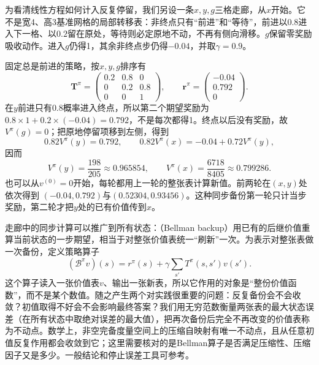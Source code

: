 \begin{example}[三个格子的独立手算模型]
 \label{ex:rl-planning-corridor}
 为看清线性方程如何计入反复停留，我们另设一条$x,y,g$三格走廊，从$x$开始。它不是宽4、高3基准网格的局部转移表：非终点只有“前进”和“等待”，前进以$0.8$进入下一格、以$0.2$留在原处，等待则必定原地不动，不再有侧向滑移。$g$保留零奖励吸收动作。进入$g$仍得1，其余非终点步仍得$-0.04$，并取$\gamma=0.9$。

 固定总是前进的策略，按$x,y,g$排序有
 \[
 \bm T^\pi=
 \begin{pmatrix}0.2&0.8&0\\0&0.2&0.8\\0&0&1\end{pmatrix},
 \qquad
 \bm r^\pi=\begin{pmatrix}-0.04\\0.792\\0\end{pmatrix}.
 \]
 在$y$前进只有$0.8$概率进入终点，所以第二个期望奖励为$0.8\times1+0.2\times(-0.04)=0.792$，不是每次都得1。终点以后没有奖励，故$V^\pi(g)=0$；把原地停留项移到左侧，得到
 \[
 0.82V^\pi(y)=0.792,\qquad
 0.82V^\pi(x)=-0.04+0.72V^\pi(y),
 \]
 因而
 \[
 V^\pi(y)=\frac{198}{205}\approx0.965854,\qquad
 V^\pi(x)=\frac{6718}{8405}\approx0.799286.
 \]
 也可以从$v^{(0)}=0$开始，每轮都用上一轮的整张表计算新值。前两轮在$(x,y)$处依次得到
 $(-0.04,0.792)$与$(0.52304,0.93456)$。这种同步备份第一轮只计当步奖励，第二轮才把$y$处的已有价值传到$x$。
\end{example}

走廊中的同步计算可以推广到所有状态：（Bellman backup）用已有的后继价值重算当前状态的一步期望，相当于对整张价值表统一“刷新”一次。为表示对整张表做一次备份，定义策略算子
\begin{equation}
 (\mathcal B^\pi v)(s)=r^\pi(s)+\gamma\sum_{s'}T^\pi(s,s')v(s').
 \label{eq:rl-planning-policy-operator}
\end{equation}
这个算子读入一张价值表$v$、输出一张新表，所以它作用的对象是“整份价值函数”，而不是某个数值。随之产生两个对实践很重要的问题：反复备份会不会收敛？初值取得不好会不会影响最终答案？我们用无穷范数衡量两张表的最大状态误差（在所有状态中取绝对误差的最大值），把再次备份后完全不再改变的价值表称为不动点。数学上，非空完备度量空间上的压缩自映射有唯一不动点，且从任意初值反复作用都会收敛到它；这里需要核对的是Bellman算子是否满足压缩性、压缩因子又是多少。一般结论和停止误差工具可参考。

